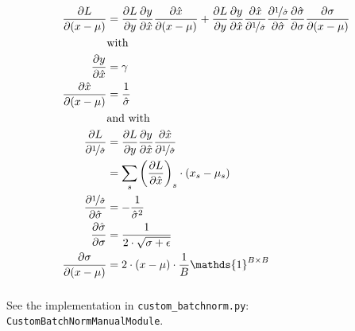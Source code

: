 \documentclass{article}
\newcommand\·{\ensuremath{\cdot}}
\newcommand\…{\ensuremath{\dots}}
\renewcommand\t{\ensuremath{\times}}
\newcommand{\⇔}{\ensuremath{\Leftrightarrow}}
\newcommand{\⇐}{\ensuremath{\Leftarrow}}
\newcommand{\⇒}{\ensuremath{\Rightarrow}}
\newcommand\f[2]{\ensuremath{\frac{#1}{#2}}}
\newcommand\nf[2]{\ensuremath{\nicefrac{#1}{#2}}}
\newcommand\pf[2]{\ensuremath{\frac{\partial {#1}}{\partial {#2}}}}
\newcommand\1{\ensuremath{\mathds{1}}}
\newcommand\ℝ{\ensuremath{\mathds{R}}}
\begin{document}
\begin{align*}
  \pf{L}{(x-\mu)} &= \pf{L}{y}\pf{y}{\hat{x}}\pf{\hat{x}}{(x-\mu)} + \pf{L}{y}\pf{y}{\hat{x}}\pf{\hat{x}}{\nf{1}{\hat{\sigma}}}\pf{\nf{1}{\hat{\sigma}}}{\hat{\sigma}}\pf{\hat{\sigma}}{\sigma}\pf{\sigma}{(x-\mu)}\\
  &\text{with}\\
  \pf{y}{\hat{x}} &= \gamma\\
  \pf{\hat{x}}{(x-\mu)} &= \f{1}{\hat{\sigma}}\\
  &\text{and with}\\
  \pf{L}{\nf{1}{\hat{\sigma}}}
  &= \pf{L}{y}\pf{y}{\hat{x}}\pf{\hat{x}}{\nf{1}{\hat{\sigma}}}\\
  &= \sum_s \left(\pf{L}{\hat{x}}\right)_s\·(x_s-\mu_s)\\
  \pf{\nf{1}{\hat{\sigma}}}{\hat{\sigma}} &= -\f{1}{\hat{\sigma}^2}\\
  \pf{\hat{\sigma}}{\sigma} &= \f{1}{2\·\sqrt{\sigma+\epsilon}}\\
  \pf{\sigma}{(x-\mu)} &= 2\·(x-\mu)\·\f{1}{B}\1^{B\t B}\\
\end{align*}

\subsubsection{}

\subsubsection{}
See the implementation in \texttt{custom\_batchnorm.py}: \texttt{CustomBatchNormManualModule}.
\end{document}
